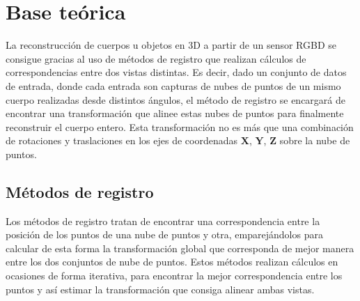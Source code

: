 \chapter{Base teórica}
\label{cap:base-teorica}

La reconstrucción de cuerpos u objetos en 3D a partir de un sensor RGBD se consigue gracias al uso de métodos de registro que realizan cálculos de correspondencias entre dos vistas distintas.
Es decir, dado un conjunto de datos de entrada, donde cada entrada son capturas de nubes de puntos de un mismo cuerpo realizadas desde distintos ángulos, el método de registro se encargará de encontrar una transformación que alinee estas nubes de puntos para finalmente reconstruir el cuerpo entero.
Esta transformación no es más que una combinación de rotaciones y traslaciones en los ejes de coordenadas $\mathbf{X}$, $\mathbf{Y}$, $\mathbf{Z}$ sobre la nube de puntos.

\section{Métodos de registro}
\label{sec:metodos-de-registro}

Los métodos de registro tratan de encontrar una correspondencia entre la posición de los puntos de una nube de puntos y otra, emparejándolos para calcular de esta forma la transformación global que corresponda de mejor manera entre los dos conjuntos de nube de puntos.
Estos métodos realizan cálculos en ocasiones de forma iterativa, para encontrar la mejor correspondencia entre los puntos y así estimar la transformación que consiga alinear ambas vistas.

